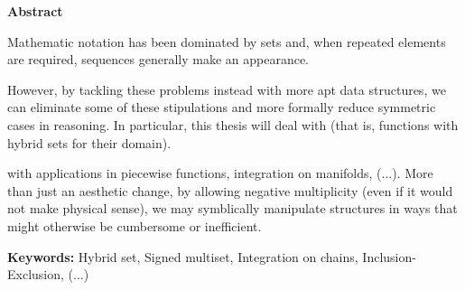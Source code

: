 \Large\begin{center}\textbf{Abstract}\end{center}\normalsize

Mathematic notation has been dominated by sets and, when repeated elements are required, sequences generally make an appearance.

However, by tackling these problems instead with more apt data structures, we can eliminate some of these stipulations and more formally reduce symmetric cases in reasoning.
In particular, this thesis will deal with  (that is, functions with hybrid sets for their domain).

  with applications in piecewise functions, integration on manifolds, (...).
More than just an aesthetic change, by allowing negative multiplicity (even if it would not make physical sense), we may symblically manipulate structures in ways that might otherwise be cumbersome or inefficient.

\vfill
\textbf{Keywords:} Hybrid set, Signed multiset, Integration on chains, Inclusion-Exclusion, (...)